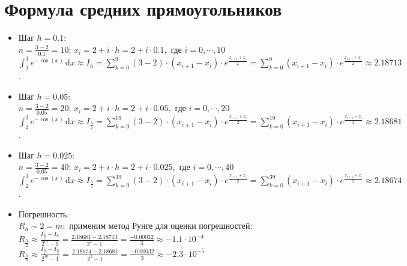 \documentclass[12pt,a4paper]{article}
\begin{document}
    \section*{Формула средних прямоугольников}
        \begin{itemize}
            \item Шаг $h = 0.1$:\\
                $n = \frac{3 - 2}{0.1} = 10 $;
                $x_{i} = 2 + i \cdot h = 2 + i \cdot 0.1,$ где $i = 0, \cdots, 10$\\
                $\int_2^3 \! e^{-\cos(x)} \, \mathrm{d}x \approx I_{h} = \sum_{k=0}^{9} (3 - 2)
                \cdot (x_{i+1} - x_{i}) \cdot e^{\frac{x_{i+1} + x_{i}}{2}} =
                \sum_{k=0}^{9} (x_{i+1} - x_{i}) \cdot e^{\frac{x_{i+1} + x_{i}}{2}}
                \approx 2.18713$.
                
            \item Шаг $h = 0.05$:\\
                $n = \frac{3 - 2}{0.05} = 20 $;
                $x_{i} = 2 + i \cdot h = 2 + i \cdot 0.05,$ где $i = 0, \cdots, 20$\\
                $\int_2^3 \! e^{-\cos(x)} \, \mathrm{d}x \approx I_{\frac{h}{2}} =
                \sum_{k=0}^{19} (3 - 2) \cdot (x_{i+1} - x_{i}) \cdot e^{\frac{x_{i+1} + x_{i}}{2}} =
                \sum_{k=0}^{19} (x_{i+1} - x_{i}) \cdot e^{\frac{x_{i+1} + x_{i}}{2}}
                \approx 2.18681$.
                
            \item Шаг $h = 0.025$:\\
                $n = \frac{3 - 2}{0.05} = 40 $;
                $x_{i} = 2 + i \cdot h = 2 + i \cdot 0.025,$ где $i = 0, \cdots, 40$\\
                $\int_2^3 \! e^{-\cos(x)} \, \mathrm{d}x \approx I_{\frac{h}{4}} =
                \sum_{k=0}^{39} (3 - 2) \cdot (x_{i+1} - x_{i}) \cdot e^{\frac{x_{i+1} + x_{i}}{2}} =
                \sum_{k=0}^{39} (x_{i+1} - x_{i}) \cdot e^{\frac{x_{i+1} + x_{i}}{2}}
                \approx 2.18674$.
                
            \item Погрешность:\\
                $R_{h} \sim 2 = m;$ применим метод Рунге для оценки погрешностей:\\
                $R_{\frac{h}{2}} \approx \frac{I_{\frac{h}{2}} - I_{h}}{2^{m} - 1} =
                \frac{2.18681 - 2.18713}{2^2 - 1} = \frac{-0.00032}{3} \approx -1.1 \cdot 10^{-4}$\\
                $R_{\frac{h}{4}} \approx \frac{I_{\frac{h}{4}} - I_{\frac{h}{2}}}{2^{m} - 1} =
                \frac{2.18674 - 2.18681}{2^2 - 1} = \frac{-0.00032}{3} \approx -2.3 \cdot 10^{-5}$
        \end{itemize}
        
\end{document}
